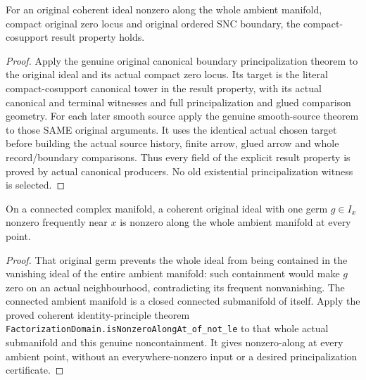 \begin{theorem}
\label{hir:original-principalization-public-canonical-producer}
For an original coherent ideal nonzero along the whole ambient
manifold, compact original zero locus and original ordered SNC
boundary, the compact-cosupport result property holds.
\leanok
\end{theorem}
\begin{proof}
Apply the genuine original canonical boundary principalization theorem
to the original ideal and its actual compact zero locus. Its target
is the literal compact-cosupport canonical tower in the result
property, with its actual canonical and terminal witnesses and full
principalization and glued comparison geometry. For each later smooth
source apply the genuine smooth-source theorem to those SAME original
arguments. It uses the identical actual chosen target before building
the actual source history, finite arrow, glued arrow and whole
record/boundary comparisons. Thus every field of the explicit result
property is proved by actual canonical producers. No old existential
principalization witness is selected.
\end{proof}

\begin{theorem}
\label{hir:original-principalization-connected-nonzero-germ-reduction}
On a connected complex manifold, a coherent original ideal with one
germ $g\in I_x$ nonzero frequently near $x$ is nonzero along the whole
ambient manifold at every point.
\leanok
\end{theorem}
\begin{proof}
That original germ prevents the whole ideal from being contained in
the vanishing ideal of the entire ambient manifold: such containment
would make $g$ zero on an actual neighbourhood, contradicting its
frequent nonvanishing. The connected ambient manifold is a closed
connected submanifold of itself. Apply the proved coherent
identity-principle theorem
\texttt{FactorizationDomain.isNonzeroAlongAt\_of\_not\_le} to that
whole actual submanifold and this genuine noncontainment. It gives
nonzero-along at every ambient point, without an everywhere-nonzero
input or a desired principalization certificate.
\end{proof}

